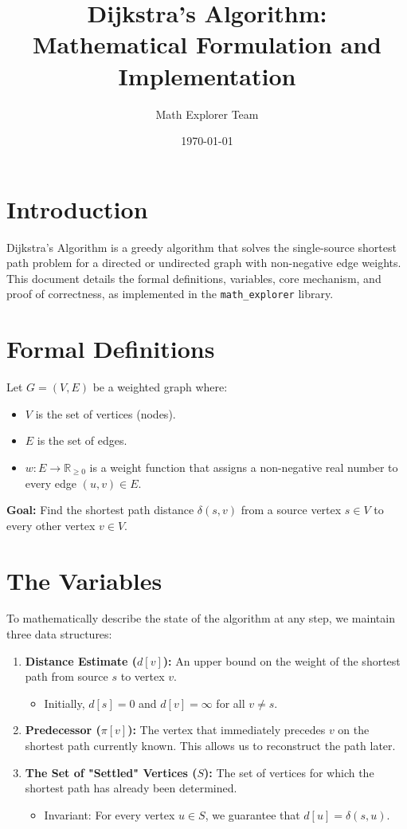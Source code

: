 \documentclass{article}
\title{Dijkstra's Algorithm: Mathematical Formulation and Implementation}
\author{Math Explorer Team}
\date{\today}
\begin{document}
\maketitle

\section{Introduction}
Dijkstra's Algorithm is a greedy algorithm that solves the single-source shortest path problem for a directed or undirected graph with non-negative edge weights. This document details the formal definitions, variables, core mechanism, and proof of correctness, as implemented in the \texttt{math\_explorer} library.

\section{Formal Definitions}
Let $G = (V, E)$ be a weighted graph where:
\begin{itemize}
    \item $V$ is the set of vertices (nodes).
    \item $E$ is the set of edges.
    \item $w: E \rightarrow \mathbb{R}_{\ge 0}$ is a weight function that assigns a non-negative real number to every edge $(u, v) \in E$.
\end{itemize}

\textbf{Goal:} Find the shortest path distance $\delta(s, v)$ from a source vertex $s \in V$ to every other vertex $v \in V$.

\section{The Variables}
To mathematically describe the state of the algorithm at any step, we maintain three data structures:

\begin{enumerate}
    \item \textbf{Distance Estimate ($d[v]$):}
    An upper bound on the weight of the shortest path from source $s$ to vertex $v$.
    \begin{itemize}
        \item Initially, $d[s] = 0$ and $d[v] = \infty$ for all $v \neq s$.
    \end{itemize}

    \item \textbf{Predecessor ($\pi[v]$):}
    The vertex that immediately precedes $v$ on the shortest path currently known. This allows us to reconstruct the path later.

    \item \textbf{The Set of "Settled" Vertices ($S$):}
    The set of vertices for which the shortest path has already been determined.
    \begin{itemize}
        \item Invariant: For every vertex $u \in S$, we guarantee that $d[u] = \delta(s, u)$.
    \end{itemize}
\end{enumerate}
\end{document}
